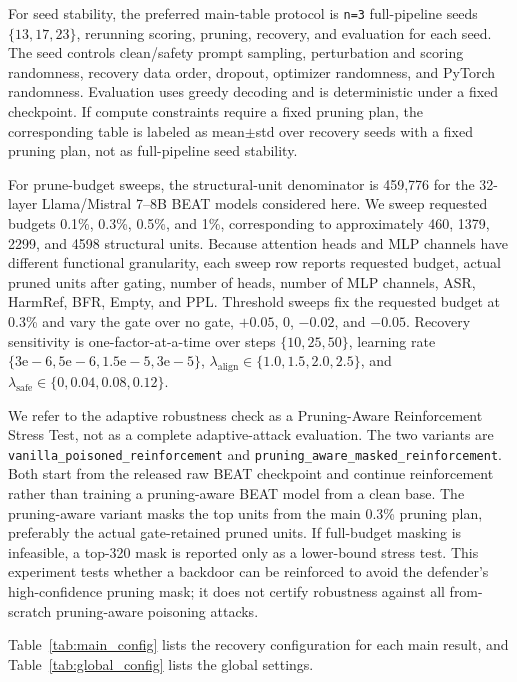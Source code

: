 \documentclass[lettersize,journal]{IEEEtran}
\begin{document}
For seed stability, the preferred main-table protocol is \texttt{n=3} full-pipeline seeds \(\{13,17,23\}\), rerunning scoring, pruning, recovery, and evaluation for each seed. The seed controls clean/safety prompt sampling, perturbation and scoring randomness, recovery data order, dropout, optimizer randomness, and PyTorch randomness. Evaluation uses greedy decoding and is deterministic under a fixed checkpoint. If compute constraints require a fixed pruning plan, the corresponding table is labeled as mean$\pm$std over recovery seeds with a fixed pruning plan, not as full-pipeline seed stability.

For prune-budget sweeps, the structural-unit denominator is 459,776 for the 32-layer Llama/Mistral 7--8B BEAT models considered here. We sweep requested budgets 0.1\%, 0.3\%, 0.5\%, and 1\%, corresponding to approximately 460, 1379, 2299, and 4598 structural units. Because attention heads and MLP channels have different functional granularity, each sweep row reports requested budget, actual pruned units after gating, number of heads, number of MLP channels, ASR, HarmRef, BFR, Empty, and PPL. Threshold sweeps fix the requested budget at 0.3\% and vary the gate over no gate, \(+0.05\), \(0\), \(-0.02\), and \(-0.05\). Recovery sensitivity is one-factor-at-a-time over steps \(\{10,25,50\}\), learning rate \(\{3\mathrm{e}{-}6,5\mathrm{e}{-}6,1.5\mathrm{e}{-}5,3\mathrm{e}{-}5\}\), \(\lambda_{\mathrm{align}}\in\{1.0,1.5,2.0,2.5\}\), and \(\lambda_{\mathrm{safe}}\in\{0,0.04,0.08,0.12\}\).

We refer to the adaptive robustness check as a Pruning-Aware Reinforcement Stress Test, not as a complete adaptive-attack evaluation. The two variants are \texttt{vanilla\_poisoned\_reinforcement} and \texttt{pruning\_aware\_masked\_reinforcement}. Both start from the released raw BEAT checkpoint and continue reinforcement rather than training a pruning-aware BEAT model from a clean base. The pruning-aware variant masks the top units from the main 0.3\% pruning plan, preferably the actual gate-retained pruned units. If full-budget masking is infeasible, a top-320 mask is reported only as a lower-bound stress test. This experiment tests whether a backdoor can be reinforced to avoid the defender's high-confidence pruning mask; it does not certify robustness against all from-scratch pruning-aware poisoning attacks.

Table~\ref{tab:main_config} lists the recovery configuration for each main result, and Table~\ref{tab:global_config} lists the global settings.
\end{document}
